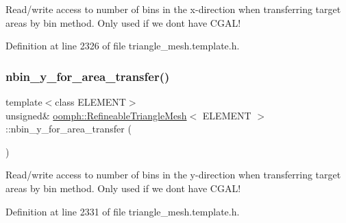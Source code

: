 Read/write access to number of bins in the x-\/direction when transferring target areas by bin method. Only used if we don\textquotesingle{}t have C\+G\+A\+L! 



Definition at line 2326 of file triangle\+\_\+mesh.\+template.\+h.

\mbox{\label{classoomph_1_1RefineableTriangleMesh_a063dc0162d4e352cbbcbbf72b1171f97}} 
\subsubsection{\texorpdfstring{nbin\+\_\+y\+\_\+for\+\_\+area\+\_\+transfer()}{nbin\_y\_for\_area\_transfer()}}
{\footnotesize\ttfamily template$<$class E\+L\+E\+M\+E\+NT$>$ \\
unsigned\& \hyperlink{classoomph_1_1RefineableTriangleMesh}{oomph\+::\+Refineable\+Triangle\+Mesh}$<$ E\+L\+E\+M\+E\+NT $>$\+::nbin\+\_\+y\+\_\+for\+\_\+area\+\_\+transfer (\begin{DoxyParamCaption}{ }\end{DoxyParamCaption})\hspace{0.3cm}{\ttfamily [inline]}}



Read/write access to number of bins in the y-\/direction when transferring target areas by bin method. Only used if we don\textquotesingle{}t have C\+G\+A\+L! 



Definition at line 2331 of file triangle\+\_\+mesh.\+template.\+h.

\mbox{\label{classoomph_1_1RefineableTriangleMesh_ad75bed93a7986b69f9bf928d88af294b}} 
